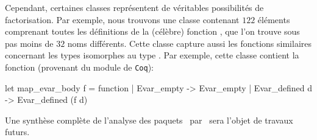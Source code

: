 Cependant, certaines classes représentent de véritables possibilités
de factorisation. Par exemple, nous trouvons une classe contenant
$122$ éléments comprenant toutes les définitions de la (célèbre)
fonction , que l'on trouve sous pas moins de $32$
noms différents. Cette classe capture aussi les fonctions similaires
concernant les types isomorphes au type . Par exemple,
cette classe contient la fonction  (provenant du
module  de \verb|Coq|):

\begin{ocaml}
let map_evar_body f = function
  | Evar_empty -> Evar_empty
  | Evar_defined d -> Evar_defined (f d)
\end{ocaml}

Une synthèse complète de l'analyse des paquets~{\Opam} par~{\Asak} sera l'objet
de travaux futurs.
